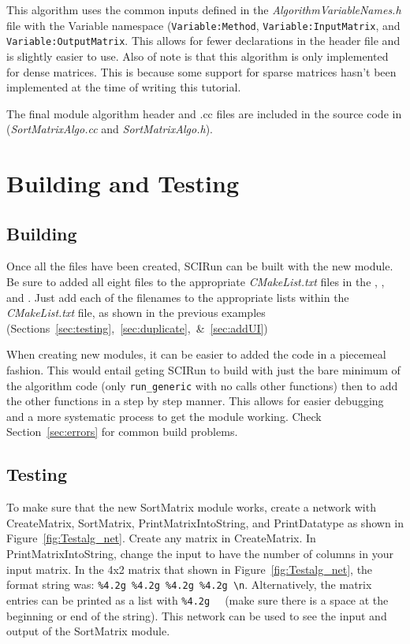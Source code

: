 \documentclass[fleqn,11pt,openany]{book}
\begin{document}
This algorithm uses the common inputs defined in the \emph{AlgorithmVariableNames.h} file with the Variable namespace (\verb|Variable:Method|, \verb|Variable:InputMatrix|, and \verb|Variable:OutputMatrix|.  
This allows for fewer declarations in the header file and is slightly easier to use.  
Also of note is that this algorithm is only implemented for dense matrices.
This is because some support for sparse matrices hasn't been implemented at the time of writing this tutorial. 

The final module algorithm header and .cc files are included in the source code in \emph{} (\emph{SortMatrixAlgo.cc} and \emph{SortMatrixAlgo.h}).

\section{Building and Testing}
\label{sec:algo_building}

\subsection{Building}

Once all the files have been created, SCIRun can be built with the new module.  
Be sure to added all eight files to the appropriate \emph{CMakeList.txt} files in the \emph{}, \emph{}, and \emph{}.  
Just add each of the filenames to the appropriate lists within the \emph{CMakeList.txt} file, as shown in the previous examples (Sections~\ref{sec:testing},~\ref{sec:duplicate},~\&~\ref{sec:addUI})

When creating new modules, it can be easier to added the code in a piecemeal fashion.
This would entail geting SCIRun to build with just the bare minimum of the algorithm code (only \verb|run_generic| with no calls other functions) then to add the other functions in a step by step manner.  
This allows for easier debugging and a more systematic process to get the module working.  
Check Section~\ref{sec:errors} for common build problems.

\subsection{Testing}

To make sure that the new SortMatrix module works, create a network with CreateMatrix, SortMatrix, PrintMatrixIntoString, and PrintDatatype as shown in Figure~\ref{fig:Testalg_net}.  
Create any matrix in CreateMatrix.
In PrintMatrixIntoString, change the input to have the number of columns in your input matrix.
In the 4x2 matrix that shown in Figure~\ref{fig:Testalg_net}, the format string was: \verb|%4.2g %4.2g %4.2g %4.2g \n|.
Alternatively, the matrix entries can be printed as a list with \verb|%4.2g  | (make sure there is a space at the beginning or end of the string).
This network can be used to see the input and output of the SortMatrix module.  
\end{document}
